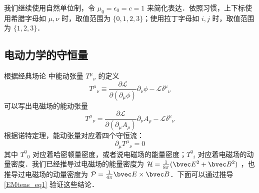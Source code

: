 
我们继续使用自然单位制，令 $\mu_0=\epsilon_0=c=1$ 来简化表达．依照习惯，上下标使用希腊字母如 $\mu, \nu$ 时，取值范围为 $\{0, 1, 2, 3\}$；使用拉丁字母如 $i, j$ 时，取值范围为 $\{1, 2, 3\}$．

\subsection{电动力学的守恒量}
根据经典场论 中能动张量 ${T^\mu}_\nu$ 的定义
\begin{equation}
T^\mu{}_\nu \equiv \frac{\partial \mathcal L}{\partial (\partial_\mu \phi)} \partial_\nu \phi - \mathcal L \delta^\mu{}_\nu
\end{equation}
可以写出电磁场的能动张量
\begin{equation}\label{EMtens_eq1}
T^\mu{}_\nu =\frac{\partial \mathcal L}{\partial (\partial_\mu A_\rho)} \partial_\nu A_\rho - \mathcal L \delta^\mu{}_\nu
\end{equation}
根据诺特定理，能动张量对应着四个守恒流：
\begin{equation}
\partial_\mu T^\mu{}_\nu=0
\end{equation}
其中 $T^0{}_0$ 对应着哈密顿量密度，或者说电磁场的能量密度；$T^0{}_i$ 对应着电磁场的动量密度．我们已经推导过电磁场的能量密度为 $\mathcal H=\frac{1}{8\pi}(\bvec E^2+\bvec B^2)$ ，也推导过电磁场的动量密度为 $\mathcal P=\frac{1}{4\pi} \bvec E\times \bvec B$．下面可以通过推导 \autoref{EMtens_eq1} 验证这些结论．


